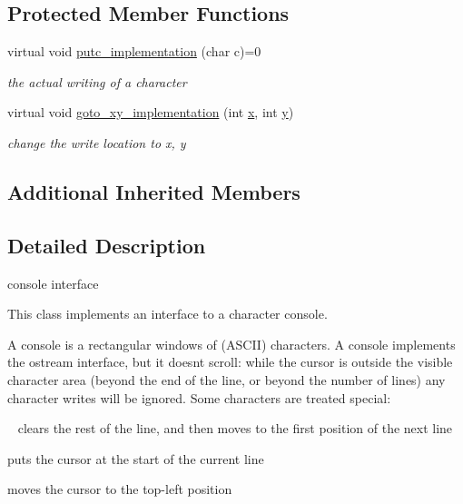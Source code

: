 \subsection*{Protected Member Functions}
\begin{DoxyCompactItemize}
\item 
virtual void \hyperlink{classhwlib_1_1console_aeced637b949acf507d165eace31bc6ce}{putc\+\_\+implementation} (char c)=0
\begin{DoxyCompactList}\small\item\em the actual writing of a character \end{DoxyCompactList}\item 
virtual void \hyperlink{classhwlib_1_1console_a453717af49292f64a0f51b71f3d02812}{goto\+\_\+xy\+\_\+implementation} (int \hyperlink{classhwlib_1_1console_a609d3968c3bce1f52481f8a5b7536b42}{x}, int \hyperlink{classhwlib_1_1console_a809dbf940620fe1ef99725f596bf892a}{y})
\begin{DoxyCompactList}\small\item\em change the write location to x, y \end{DoxyCompactList}\end{DoxyCompactItemize}
\subsection*{Additional Inherited Members}


\subsection{Detailed Description}
console interface 

This class implements an interface to a character console.

A console is a rectangular windows of (A\+S\+C\+II) characters. A console implements the ostream interface, but it doesn\textquotesingle{}t scroll\+: while the cursor is outside the visible character area (beyond the end of the line, or beyond the number of lines) any character writes will be ignored. Some characters are treated special\+:
\begin{DoxyItemize}
\item \textquotesingle{}~\newline
\textquotesingle{} clears the rest of the line, and then moves to the first position of the next line
\item \textquotesingle{}\textquotesingle{} puts the cursor at the start of the current line
\item \textquotesingle{}{\ttfamily }\textquotesingle{} moves the cursor to the top-\/left position
\end{DoxyItemize}


